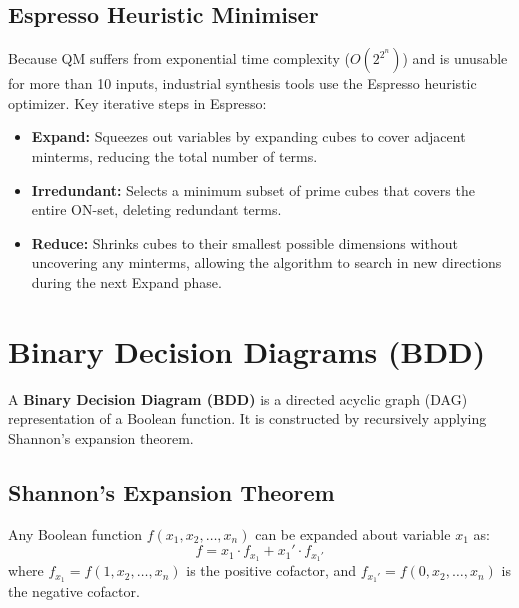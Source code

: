 \documentclass[12pt,a4paper]{article}
\begin{document}
\subsection{Espresso Heuristic Minimiser}
Because QM suffers from exponential time complexity ($O(2^{2^n})$) and is unusable for more than 10 inputs, industrial synthesis tools use the Espresso heuristic optimizer.
Key iterative steps in Espresso:
\begin{itemize}[leftmargin=*, itemsep=2pt]
  \item \textbf{Expand:} Squeezes out variables by expanding cubes to cover adjacent minterms, reducing the total number of terms.
  \item \textbf{Irredundant:} Selects a minimum subset of prime cubes that covers the entire ON-set, deleting redundant terms.
  \item \textbf{Reduce:} Shrinks cubes to their smallest possible dimensions without uncovering any minterms, allowing the algorithm to search in new directions during the next Expand phase.
\end{itemize}

\section{Binary Decision Diagrams (BDD)}

\begin{tcolorbox}[defbox, title={Binary Decision Diagram}]
  A \textbf{Binary Decision Diagram (BDD)} is a directed acyclic graph (DAG) representation of a Boolean function. It is constructed by recursively applying Shannon's expansion theorem.
\end{tcolorbox}

\subsection{Shannon's Expansion Theorem}
Any Boolean function $f(x_1, x_2, \dots, x_n)$ can be expanded about variable $x_1$ as:
\begin{equation}
  f = x_1 \cdot f_{x_1} + x_1' \cdot f_{x_1'}
\end{equation}
where $f_{x_1} = f(1, x_2, \dots, x_n)$ is the positive cofactor, and $f_{x_1'} = f(0, x_2, \dots, x_n)$ is the negative cofactor.
\end{document}
